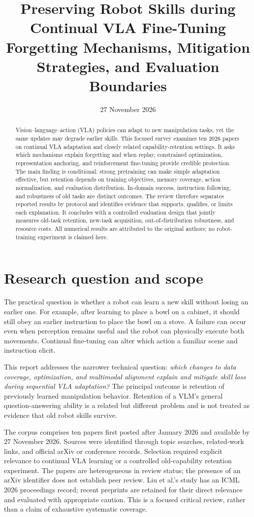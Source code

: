 \documentclass[11pt,a4paper]{article}
\title{\vspace{-1.5em}\textbf{Preserving Robot Skills during Continual VLA Fine-Tuning}\\[0.35em]\large Forgetting Mechanisms, Mitigation Strategies, and Evaluation Boundaries}
\author{\StudentName}
\date{27 November 2026}
\begin{document}
\maketitle
\begin{abstract}
Vision--language--action (VLA) policies can adapt to new manipulation tasks, yet the same updates may degrade earlier skills. This focused survey examines ten 2026 papers on continual VLA adaptation and closely related capability-retention settings. It asks which mechanisms explain forgetting and when replay, constrained optimization, representation anchoring, and reinforcement fine-tuning provide credible protection. The main finding is conditional: strong pretraining can make simple adaptation effective, but retention depends on training objectives, memory coverage, action normalization, and evaluation distribution. In-domain success, instruction following, and robustness of old tasks are distinct outcomes. The review therefore separates reported results by protocol and identifies evidence that supports, qualifies, or limits each explanation. It concludes with a controlled evaluation design that jointly measures old-task retention, new-task acquisition, out-of-distribution robustness, and resource costs. All numerical results are attributed to the original authors; no robot-training experiment is claimed here.
\end{abstract}

\section{Research question and scope}
The practical question is whether a robot can learn a new skill without losing an earlier one. For example, after learning to place a bowl on a cabinet, it should still obey an earlier instruction to place the bowl on a stove. A failure can occur even when perception remains useful and the robot can physically execute both movements. Continual fine-tuning can alter which action a familiar scene and instruction elicit.

This report addresses the narrower technical question: \emph{which changes to data coverage, optimization, and multimodal alignment explain and mitigate skill loss during sequential VLA adaptation?} The principal outcome is retention of previously learned manipulation behavior. Retention of a VLM's general question-answering ability is a related but different problem and is not treated as evidence that old robot skills survive.

The corpus comprises ten papers first posted after January 2026 and available by 27 November 2026. Sources were identified through topic searches, related-work links, and official arXiv or conference records. Selection required explicit relevance to continual VLA learning or a controlled old-capability retention experiment. The papers are heterogeneous in review status; the presence of an arXiv identifier does not establish peer review. Liu et al.'s study has an ICML 2026 proceedings record; recent preprints are retained for their direct relevance and evaluated with appropriate caution. This is a focused critical review, rather than a claim of exhaustive systematic coverage.
\end{document}

